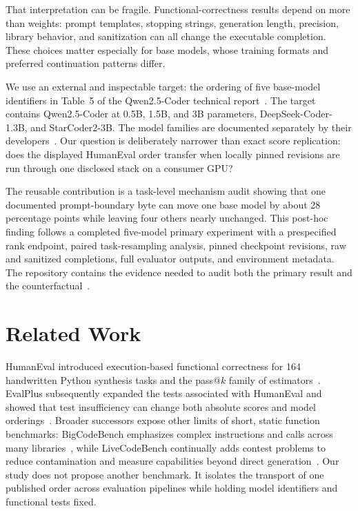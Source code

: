 \documentclass[10pt,twocolumn]{article}
\begin{document}
That interpretation can be fragile. Functional-correctness results depend on more than weights: prompt templates, stopping strings, generation length, precision, library behavior, and sanitization can all change the executable completion. These choices matter especially for base models, whose training formats and preferred continuation patterns differ.

We use an external and inspectable target: the ordering of five base-model identifiers in Table~5 of the Qwen2.5-Coder technical report~\citep{hui2024qwen25coder}. The target contains Qwen2.5-Coder at 0.5B, 1.5B, and 3B parameters, DeepSeek-Coder-1.3B, and StarCoder2-3B. The model families are documented separately by their developers~\citep{hui2024qwen25coder,lozhkov2024starcoder2,guo2024deepseekcoder}. Our question is deliberately narrower than exact score replication: does the displayed HumanEval order transfer when locally pinned revisions are run through one disclosed stack on a consumer GPU?

The reusable contribution is a task-level mechanism audit showing that one documented prompt-boundary byte can move one base model by about 28 percentage points while leaving four others nearly unchanged. This post-hoc finding follows a completed five-model primary experiment with a prespecified rank endpoint, paired task-resampling analysis, pinned checkpoint revisions, raw and sanitized completions, full evaluator outputs, and environment metadata. The repository contains the evidence needed to audit both the primary result and the counterfactual~\citep{bassi2026repository}.

\section{Related Work}

HumanEval introduced execution-based functional correctness for 164 handwritten Python synthesis tasks and the pass@$k$ family of estimators~\citep{chen2021humaneval}. EvalPlus subsequently expanded the tests associated with HumanEval and showed that test insufficiency can change both absolute scores and model orderings~\citep{liu2023evalplus}. Broader successors expose other limits of short, static function benchmarks: BigCodeBench emphasizes complex instructions and calls across many libraries~\citep{zhuo2024bigcodebench}, while LiveCodeBench continually adds contest problems to reduce contamination and measure capabilities beyond direct generation~\citep{jain2024livecodebench}. Our study does not propose another benchmark. It isolates the transport of one published order across evaluation pipelines while holding model identifiers and functional tests fixed.
\end{document}
